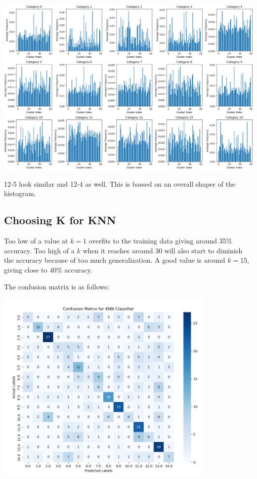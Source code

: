\documentclass[12pt]{article}
\begin{document}
\begin{center}
  \includegraphics[width=1.05\textwidth]{imgs/histograms.png}
\end{center}

12-5 look similar and 12-4 as well. This is bassed on an overall shaper of the histogram.

\subsection*{Choosing K for KNN}
Too low of a value at $k=1$ overfits to the training data giving around 35\% accuracy. Too high of a $k$ when it reaches around 30 will also start to diminish the accuracy because of too much generalization. A good value is around $k=15$, giving close to $40\%$ accuracy.

The confusion matrix is as follows:

\begin{center}
  \includegraphics[width=0.8\textwidth]{imgs/knn.png} 
\end{center}
\end{document}
